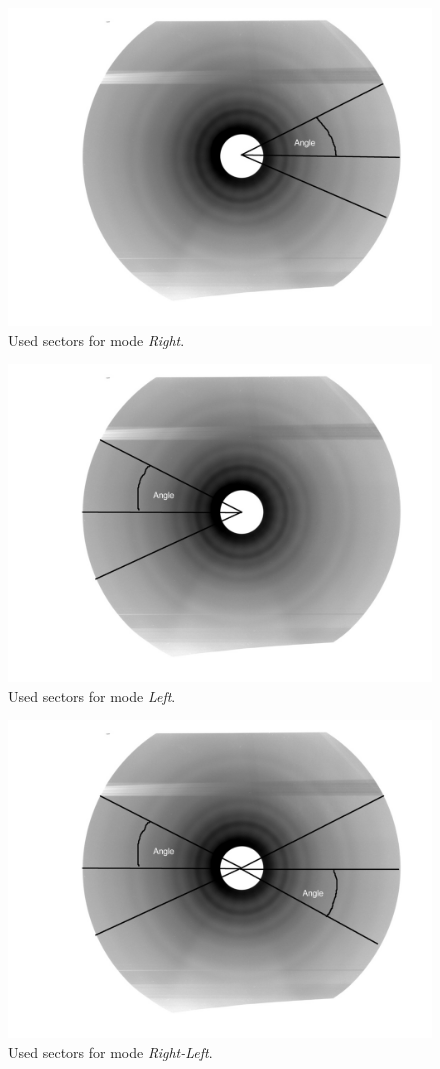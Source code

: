 \begin{figure}
\includegraphics[width=12cm]{right.jpg}
\caption{Used sectors for mode \textit{Right}. }
\label{moderight} 
\end{figure} 

\begin{figure}
\includegraphics[width=12cm]{left.jpg}
\caption{Used sectors for mode \textit{Left}. }
\label{modeleft} 
\end{figure} 

\begin{figure}
\includegraphics[width=12cm]{rightleft.jpg}
\caption{Used sectors for mode \textit{Right-Left}. }
\label{moderightleft} 
\end{figure} 
  
